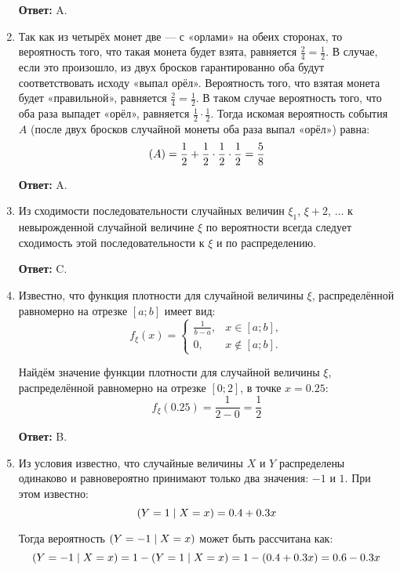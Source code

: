 \documentclass[a4paper]{article} %
\let\P\relax
\DeclareMathOperator{\P}{\mathbb{P}}
\begin{document}
\begin{enumerate}
    \textbf{Ответ:} A.
    
    
    \item 
    Так как из четырёх монет две — с «орлами» на обеих сторонах, то вероятность того, что такая монета будет взята, равняется $\frac{2}{4} = \frac{1}{2}$.
    В случае, если это произошло, из двух бросков гарантированно оба будут соответствовать исходу «выпал орёл».
    Вероятность того, что взятая монета будет «правильной», равняется $\frac{2}{4} = \frac{1}{2}$.
    В таком случае вероятность того, что оба раза выпадет «орёл», равняется $\frac{1}{2}\cdot\frac{1}{2}$.
    Тогда искомая вероятность события $A$ (после двух бросков случайной монеты оба раза выпал «орёл») равна:
     \[
     \P(A) = \frac{1}{2} + \frac{1}{2} \cdot \frac{1}{2} \cdot \frac{1}{2} = \frac{5}{8}
     \]
    
    \textbf{Ответ:} A.
    
    
    \item
    Из сходимости последовательности случайных величин $\xi_{1}$, $\xi+{2}$, $\ldots$ к невырожденной случайной величине $\xi$ по вероятности всегда следует сходимость этой последовательности к $\xi$ и по распределению.
    
    \textbf{Ответ:} C.
    
    
    \item
    Известно, что функция плотности для случайной величины $\xi$, распределённой равномерно на отрезке $[a; b]$ имеет вид:
    \[
    f_{\xi}(x) =
    \begin{cases}
    \frac{1}{b - a}, & x \in [a; b], \\
    0, & x \notin [a; b].
    \end{cases}
    \]
    
    Найдём значение функции плотности для случайной величины $\xi$, распределённой равномерно на отрезке $[0; 2]$, в точке $x = 0.25$:
    \[
    f_{\xi}(0.25) = \frac{1}{2 - 0} = \frac{1}{2}
    \]
    
    \textbf{Ответ:} B.
    

    \item
    Из условия известно, что случайные величины $X$ и $Y$ распределены одинаково и равновероятно принимают только два значения: $-1$ и $1$.
    При этом известно:
    \[
    \P(Y = 1 \mid X = x) = 0.4 + 0.3x
    \]
    
    Тогда вероятность $\P(Y = -1 \mid X = x)$ может быть рассчитана как:
    \[
    \P(Y = -1 \mid X = x)  = 1 - \P(Y = 1 \mid X = x) = 1 - (0.4 + 0.3x) = 0.6 - 0.3x
    \]
    

\end{enumerate}
\end{document}
